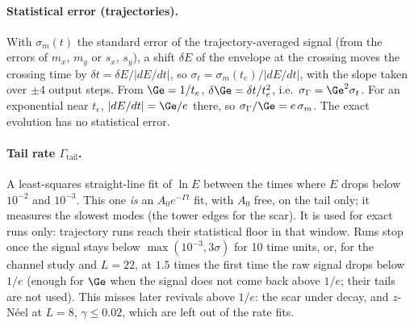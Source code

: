 \paragraph{Statistical error (trajectories).} With $\sigma_m(t)$ the standard error of the trajectory-averaged signal (from the errors of $m_x$, $m_y$ or $s_x$, $s_y$), a shift $\delta E$ of the envelope at the crossing moves the crossing time by $\delta t = \delta E/\lvert dE/dt\rvert$, so $\sigma_t = \sigma_m(t_e)/\lvert dE/dt\rvert$, with the slope taken over $\pm 4$ output steps. From $\Ge = 1/t_e$, $\delta\Ge = \delta t/t_e^2$, i.e.\ $\sigma_\Gamma = \Ge^2\sigma_t$. For an exponential near $t_e$, $\lvert dE/dt\rvert = \Ge/e$ there, so $\sigma_\Gamma/\Ge = e\,\sigma_m$. The exact evolution has no statistical error.

\paragraph{Tail rate $\Gamma_{\mathrm{tail}}$.} A least-squares straight-line fit of $\ln E$ between the times where $E$ drops below $10^{-2}$ and $10^{-3}$. This one \emph{is} an $A_0e^{-\Gamma t}$ fit, with $A_0$ free, on the tail only; it measures the slowest modes (the tower edges for the scar). It is used for exact runs only: trajectory runs reach their statistical floor in that window. Runs stop once the signal stays below $\max(10^{-3}, 3\sigma)$ for 10 time units, or, for the channel study and $L = 22$, at $1.5$ times the first time the raw signal drops below $1/e$ (enough for $\Ge$ when the signal does not come back above $1/e$; their tails are not used). This misses later revivals above $1/e$: the scar under decay, and $z$-N\'eel at $L = 8$, $\gamma \le 0.02$, which are left out of the rate fits.

